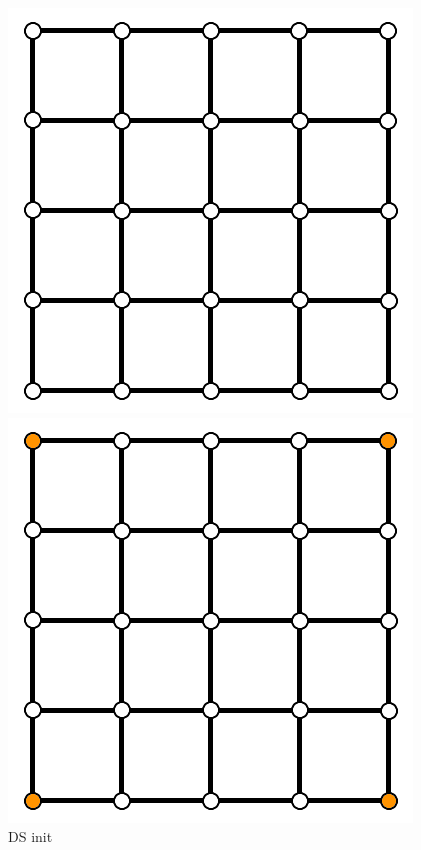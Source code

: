 \documentclass[11pt,a4paper,twoside,openright]{report}
\begin{document}
\begin{figure}[!htb]
  \includegraphics[width=\linewidth]{ds0.png}
  \caption{DS init}\label{fig:ds0}
\endminipage\hfill
{}
  \includegraphics[width=\linewidth]{ds1.png}

\end{figure}
\end{document}
